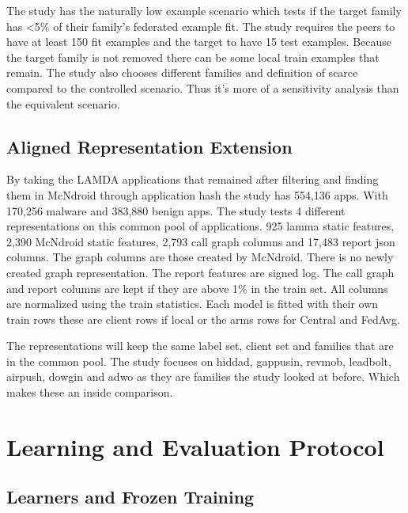 \documentclass[12pt,letterpaper]{article}
\begin{document}
The study has the naturally low example scenario which tests if the target family has <5\% of their family's federated example fit. The study requires the peers to have at least 150 fit examples and the target to have 15 test examples. Because the target family is not removed there can be some local train examples that remain. The study also chooses different families and definition of scarce compared to the controlled scenario. Thus it's more of a sensitivity analysis than the equivalent scenario.

\subsection*{Aligned Representation Extension} 

By taking the LAMDA applications that remained after filtering and finding them in McNdroid through application hash the study has 554,136 apps. With 170,256 malware and 383,880 benign apps. The study tests 4 different representations on this common pool of applications. 925 lamma static features, 2,390 McNdroid static features, 2,793 call graph columns and 17,483 report json columns. The graph columns are those created by McNdroid. There is no newly created graph representation. The report features are signed log. The call graph and report columns are kept if they are above 1\% in the train set. All columns are normalized using the train statistics. Each model is fitted with their own train rows these are client rows if local or the arms rows for Central and FedAvg.

The representations will keep the same label set, client set and families that are in the common pool. The study focuses on hiddad, gappusin, revmob, leadbolt, airpush, dowgin and adwo as they are families the study looked at before. Which makes these an inside comparison. 

\section*{Learning and Evaluation Protocol}

\subsection*{Learners and Frozen Training}
\end{document}
